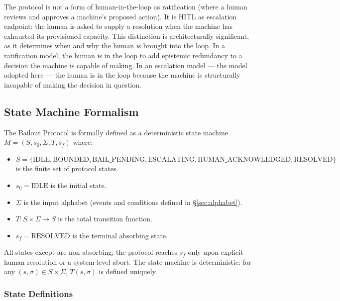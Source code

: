 The protocol is not a form of human-in-the-loop as ratification (where a human reviews and approves a machine's proposed action). It is HITL as escalation endpoint: the human is asked to supply a resolution when the machine has exhausted its provisioned capacity. This distinction is architecturally significant, as it determines when and why the human is brought into the loop. In a ratification model, the human is in the loop to add epistemic redundancy to a decision the machine is capable of making. In an escalation model — the model adopted here — the human is in the loop because the machine is structurally incapable of making the decision in question.

\subsection{State Machine Formalism}
\label{sec:state-machine}

The Bailout Protocol is formally defined as a deterministic state machine $M = (S, s_0, \Sigma, T, s_f)$ where:

\begin{itemize}
\item $S = \{\text{IDLE}, \text{BOUNDED}, \text{BAIL\_PENDING}, \text{ESCALATING}, \text{HUMAN\_ACKNOWLEDGED}, \text{RESOLVED}\}$ is the finite set of protocol states.
\item $s_0 = \text{IDLE}$ is the initial state.
\item $\Sigma$ is the input alphabet (events and conditions defined in \S\ref{sec:alphabet}).
\item $T: S \times \Sigma \rightarrow S$ is the total transition function.
\item $s_f = \text{RESOLVED}$ is the terminal absorbing state.
\end{itemize}

All states except  are non-absorbing; the protocol reaches $s_f$ only upon explicit human resolution or a system-level abort. The state machine is deterministic: for any $(s, \sigma) \in S \times \Sigma$, $T(s, \sigma)$ is defined uniquely.

\subsubsection{State Definitions}
\label{sec:state-definitions}

